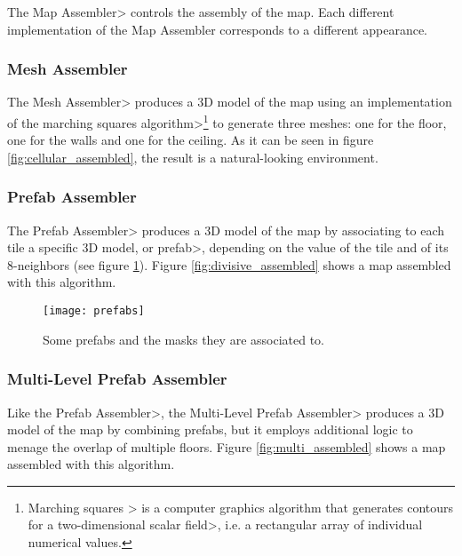 The \<Map Assembler> controls the assembly of the map. Each different implementation of the Map Assembler corresponds to a different appearance.


\subsubsection{Mesh Assembler}

The \<Mesh Assembler> produces a 3D model of the map using an implementation of the \<marching squares algorithm>\footnote{\<Marching squares > is a computer graphics algorithm that generates contours for a \<two-dimensional scalar field>, i.e. a rectangular array of individual numerical values.} to generate three meshes: one for the floor, one for the walls and one for the ceiling. As it can be seen in figure \ref{fig:cellular_assembled}, the result is a natural-looking environment.


\subsubsection{Prefab Assembler}

The \<Prefab Assembler> produces a 3D model of the map by associating to each tile a specific 3D model, or \<prefab>, depending on the value of the tile and of its 8-neighbors (see figure \ref{fig:prefabs}). Figure \ref{fig:divisive_assembled} shows a map assembled with this algorithm.

\begin{figure}
\texttt{[image: prefabs]}
\caption{Some prefabs and the masks they are associated to.}
\label{fig:prefabs}
\end{figure}


\subsubsection{Multi-Level Prefab Assembler}

Like the \<Prefab Assembler>, the \<Multi-Level Prefab Assembler> produces a 3D model of the map by combining prefabs, but it employs additional logic to menage the overlap of multiple floors. Figure \ref{fig:multi_assembled} shows a map assembled with this algorithm.

